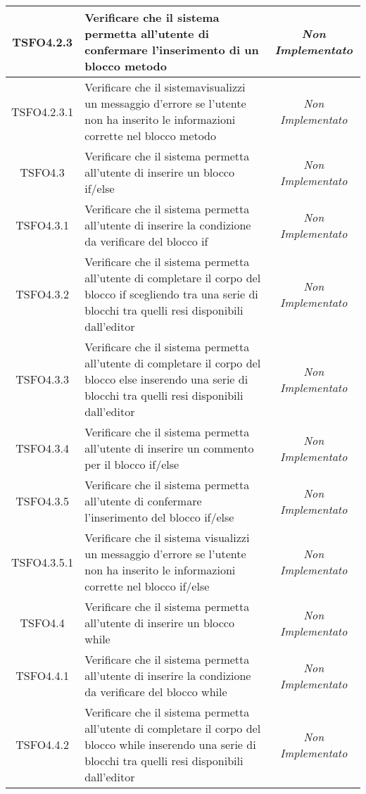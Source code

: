 \begin{longtable}{|c|>{}m{8cm}|c|}
\hypertarget{TSFO4.2.3}{TSFO4.2.3} & Verificare che il sistema permetta all'utente di confermare l'inserimento di un blocco metodo & \textit{Non Implementato}\\ \hline
\hypertarget{TSFO4.2.3.1}{TSFO4.2.3.1} & Verificare che il sistemavisualizzi un messaggio d'errore se l'utente non ha inserito le informazioni corrette nel blocco metodo  & \textit{Non Implementato}\\ \hline
\hypertarget{TSFO4.3}{TSFO4.3} & Verificare che il sistema permetta all'utente di inserire un blocco if/else & \textit{Non Implementato}\\ \hline
\hypertarget{TSFO4.3.1}{TSFO4.3.1} & Verificare che il sistema permetta all'utente di inserire la condizione da verificare del blocco if & \textit{Non Implementato}\\ \hline
\hypertarget{TSFO4.3.2}{TSFO4.3.2} & Verificare che il sistema permetta all'utente di completare il corpo del blocco if scegliendo tra una serie di blocchi tra quelli resi disponibili dall'editor & \textit{Non Implementato}\\ \hline
\hypertarget{TSFO4.3.3}{TSFO4.3.3} & Verificare che il sistema permetta all'utente di completare il corpo del blocco else inserendo una serie di blocchi tra quelli resi disponibili dall'editor & \textit{Non Implementato}\\ \hline
\hypertarget{TSFO4.3.4}{TSFO4.3.4} & Verificare che il sistema permetta all'utente di inserire un commento per il blocco if/else & \textit{Non Implementato}\\ \hline
\hypertarget{TSFO4.3.5}{TSFO4.3.5} & Verificare che il sistema permetta all'utente di confermare l'inserimento del blocco if/else & \textit{Non Implementato}\\ \hline
\hypertarget{TSFO4.3.5.1}{TSFO4.3.5.1} & Verificare che il sistema visualizzi un messaggio d'errore se l'utente non ha inserito le informazioni corrette nel blocco if/else & \textit{Non Implementato}\\ \hline
\hypertarget{TSFO4.4}{TSFO4.4} & Verificare che il sistema permetta all'utente di inserire un blocco while & \textit{Non Implementato}\\ \hline
\hypertarget{TSFO4.4.1}{TSFO4.4.1} & Verificare che il sistema permetta all'utente di inserire la condizione da verificare del blocco while & \textit{Non Implementato}\\ \hline
\hypertarget{TSFO4.4.2}{TSFO4.4.2} & Verificare che il sistema permetta all'utente di completare il corpo del blocco while inserendo una serie di blocchi tra quelli resi disponibili dall'editor & \textit{Non Implementato}\\ \hline

\end{longtable}
